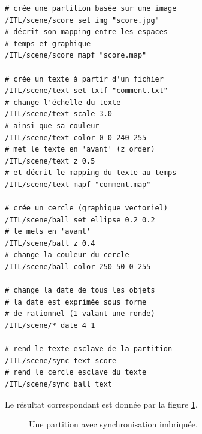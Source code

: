 \documentclass{article}
\begin{document}
{\small \begin{verbatim}
# crée une partition basée sur une image
/ITL/scene/score set img "score.jpg"
# décrit son mapping entre les espaces 
# temps et graphique 
/ITL/scene/score mapf "score.map"

# crée un texte à partir d'un fichier
/ITL/scene/text set txtf "comment.txt"
# change l'échelle du texte
/ITL/scene/text scale 3.0
# ainsi que sa couleur
/ITL/scene/text color 0 0 240 255
# met le texte en 'avant' (z order)
/ITL/scene/text z 0.5
# et décrit le mapping du texte au temps
/ITL/scene/text mapf "comment.map"

# crée un cercle (graphique vectoriel)
/ITL/scene/ball set ellipse 0.2 0.2
# le mets en 'avant'
/ITL/scene/ball z 0.4
# change la couleur du cercle
/ITL/scene/ball color 250 50 0 255

# change la date de tous les objets
# la date est exprimée sous forme 
# de rationnel (1 valant une ronde)
/ITL/scene/* date 4 1

# rend le texte esclave de la partition
/ITL/scene/sync text score
# rend le cercle esclave du texte
/ITL/scene/sync ball text
\end{verbatim}
}

Le résultat correspondant est donnée par la figure \ref{fig:scene}.

\begin{figure}[htbp]
\centerline{}
\caption{Une partition avec synchronisation imbriquée.}
\label{fig:scene}
\end{figure}
\end{document}
